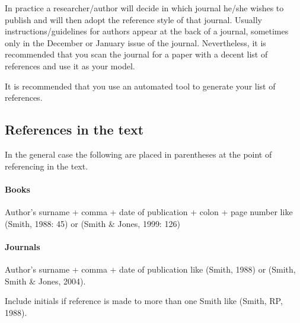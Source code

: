 \documentclass[a5paper, 10pt]{article}
\begin{document}
In practice a researcher/author will decide in which journal he/she
wishes to publish and will then adopt the reference style of that
journal.  Usually instructions/guidelines for authors appear at the
back of a journal, sometimes only in the December or January issue of
the journal.  Nevertheless, it is recommended that you scan the
journal for a paper with a decent list of references and use it as
your model.

It is recommended that you use an automated tool to generate your list of references.

\subsection{References in the text}

In the general case the following are placed in parentheses at the point
of referencing in the text.

\paragraph{Books} Author's surname + comma + date of publication + colon +
page number like (Smith, 1988: 45) or (Smith \& Jones, 1999: 126)

\paragraph{Journals} Author's surname + comma + date of publication like
(Smith, 1988) or (Smith, Smith \& Jones, 2004).

Include initials if reference is made to more than one Smith like
(Smith, RP, 1988).
\end{document}
